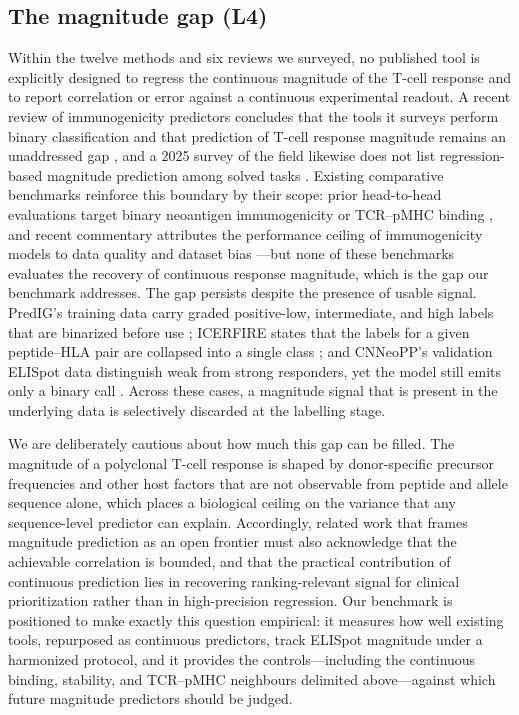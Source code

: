 \subsection{The magnitude gap (L4)}
\label{sec:related:gap}

Within the twelve methods and six reviews we surveyed, no published tool is
explicitly designed to regress the continuous magnitude of the T-cell response and
to report correlation or error against a continuous experimental readout. A recent
review of immunogenicity predictors concludes that the tools it surveys perform
binary classification and that prediction of T-cell response magnitude remains an
unaddressed gap \cite{explorationpub2023}, and a 2025 survey of the field
likewise does not list regression-based magnitude prediction among solved tasks
\cite{Zhao2025}. Existing comparative benchmarks reinforce this boundary by their
scope: prior head-to-head evaluations target binary neoantigen immunogenicity
\cite{Nibeyro2023} or TCR--pMHC binding \cite{Gielis2023}, and recent commentary
attributes the performance ceiling of immunogenicity models to data quality and
dataset bias \cite{OBrien2023}---but none of these benchmarks evaluates the
recovery of continuous response magnitude, which is the gap our benchmark
addresses. The gap persists despite the presence of usable signal. PredIG's
training data carry graded positive-low, intermediate, and high labels that are
binarized before use \cite{PredIG2025}; ICERFIRE states that the labels for a
given peptide--HLA pair are collapsed into a single class
\cite{ICERFIRE2024}; and CNNeoPP's validation ELISpot data distinguish weak from
strong responders, yet the model still emits only a binary call
\cite{CNNeoPP2026}. Across these cases, a magnitude signal that is present in the
underlying data is selectively discarded at the labelling stage.

We are deliberately cautious about how much this gap can be filled. The magnitude
of a polyclonal T-cell response is shaped by donor-specific precursor frequencies
and other host factors that are not observable from peptide and allele sequence
alone, which places a biological ceiling on the variance that any sequence-level
predictor can explain. Accordingly, related work that frames magnitude prediction
as an open frontier must also acknowledge that the achievable correlation is
bounded, and that the practical contribution of continuous prediction lies in
recovering ranking-relevant signal for clinical prioritization rather than in
high-precision regression. Our benchmark is positioned to make exactly this
question empirical: it measures how well existing tools, repurposed as continuous
predictors, track ELISpot magnitude under a harmonized protocol, and it provides
the controls---including the continuous binding, stability, and TCR--pMHC
neighbours delimited above---against which future magnitude predictors should be
judged.
